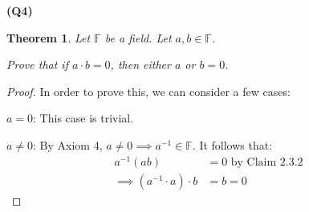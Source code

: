\documentclass[12pt, a4paper]{article}
\newcommand{\F}{\mathbb{F}}
\newtheorem{theorem}{Theorem}
\begin{document}
\noindent\textbf{(Q4)}

\begin{theorem}
    Let $\F$ be a field. Let $a,b \in \F$.

    Prove that if $a \cdot b = 0$, then either $a$ or $b = 0$.
\end{theorem}

\begin{proof}
    In order to prove this, we can consider a few cases:

    $a = 0$: This case is trivial.

    $a \neq 0$: By Axiom 4, $a \neq 0 \implies a^{-1} \in \F$. It follows that:
    \begin{align*}
        a^{-1}(ab) & = 0 \text{ by Claim 2.3.2}\\
        \implies (a^{-1} \cdot a) \cdot b & = b = 0
    \end{align*}
\end{proof}
\end{document}
